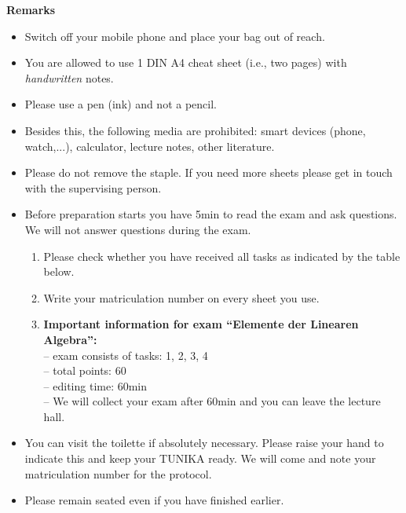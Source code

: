 \documentclass[10pt]{scrartcl}
\begin{document}
\begin{center}
	\begin{minipage}{0.8\textwidth}
\begin{center}
	\textbf{Remarks}\\
\begin{itemize}
\item Switch off your mobile phone and place your bag out of reach.	
\item You are allowed to use 1 DIN A4 cheat sheet (i.e., two pages) with \textit{handwritten} notes.
\item Please use a pen (ink) and not a pencil.
\item Besides this, the following media are prohibited: smart devices (phone, watch,...), calculator, lecture notes, other literature.
\item Please do not remove the staple. If you need more sheets please get in touch with the supervising person.
%
\item Before preparation starts you have 5min to read the exam and ask questions. We will not answer questions during the exam.
%
\begin{enumerate}
 \item Please check whether you have received all tasks as indicated by the table below.
 \item Write your matriculation number on every sheet you use.
\item \textbf{Important information for exam ``Elemente der Linearen Algebra'':}\\
-- exam consists of tasks: 1, 2, 3, 4\\
-- total points: 60\\
-- editing time: 60min\\
-- We will collect your exam after 60min and you can leave the lecture hall.

\end{enumerate}

\item You can visit the toilette if absolutely necessary. Please raise your hand to indicate this and keep your TUNIKA ready. We will come and note your matriculation number for the protocol.
\item Please remain seated even if you have finished earlier.
	
	
	
\end{itemize}
\end{center}
%
%
	\end{minipage}
\end{center}
\end{document}
